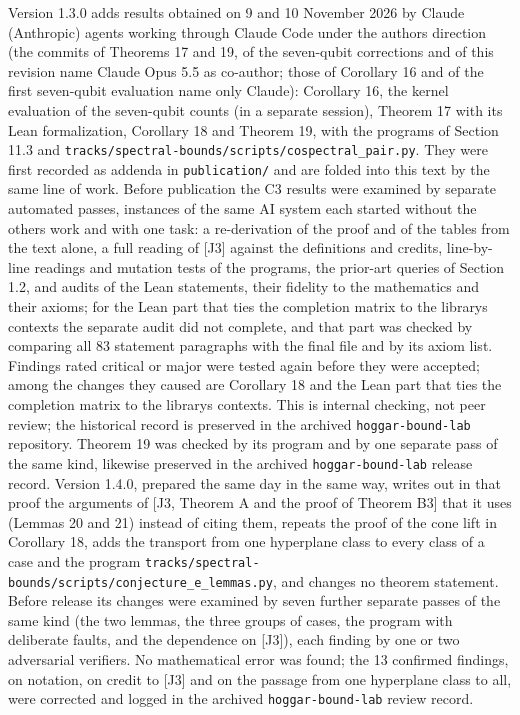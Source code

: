 \documentclass[11pt,a4paper]{article}
\begin{document}
Version 1.3.0 adds results obtained on 9 and 10 November 2026 by Claude (Anthropic) agents working
through Claude Code under the author\textquotesingle s direction (the commits of Theorems 17 and 19, of the seven-qubit
corrections and of this revision name Claude Opus 5.5 as co-author; those of Corollary 16 and of the
first seven-qubit evaluation name only Claude): Corollary 16, the kernel evaluation of the
seven-qubit counts (in a separate session), Theorem 17 with its Lean formalization, Corollary 18 and
Theorem 19, with the programs of Section 11.3 and \nolinkurl{tracks/spectral-bounds/scripts/cospectral_pair.py}. They were first
recorded as addenda in \texttt{publication/} and are folded into this text by the same line of work. Before
publication the C3 results were examined by separate automated passes, instances of the same AI system
each started without the others\textquotesingle{} work and with one task: a re-derivation of the proof and of the
tables from the text alone, a full reading of {[}J3{]} against the definitions and credits, line-by-line
readings and mutation tests of the programs, the prior-art queries of Section 1.2, and audits of the
Lean statements, their fidelity to the mathematics and their axioms; for the Lean part that ties the
completion matrix to the library\textquotesingle s contexts the separate audit did not complete, and that part was
checked by comparing all 83 statement paragraphs with the final file and by its axiom list. Findings
rated critical or major
were tested again before they were accepted; among the changes they caused are Corollary 18 and the
Lean part that ties the completion matrix to the library\textquotesingle s contexts. This is internal checking, not
peer review; the historical record is preserved in the archived \texttt{hoggar-bound-lab} repository. Theorem 19 was checked by its
program and by one separate pass of the same kind, likewise preserved in the archived \texttt{hoggar-bound-lab} release record.
Version 1.4.0, prepared the same day in the same way, writes out in that proof the arguments of
{[}J3, Theorem A and the proof of Theorem B3{]} that it uses (Lemmas 20 and 21) instead of citing them,
repeats the proof of the cone lift in Corollary 18, adds the transport from one hyperplane class to
every class of a case and the program \nolinkurl{tracks/spectral-bounds/scripts/conjecture_e_lemmas.py}, and changes no theorem
statement. Before release its changes were examined by seven further separate passes of the same
kind (the two lemmas, the three groups of cases, the program with deliberate faults, and the
dependence on {[}J3{]}), each finding by one or two adversarial verifiers. No mathematical error was
found; the 13 confirmed findings, on notation, on credit to {[}J3{]} and on the passage from one
hyperplane class to all, were corrected and logged in the archived \texttt{hoggar-bound-lab} review record.
\end{document}
